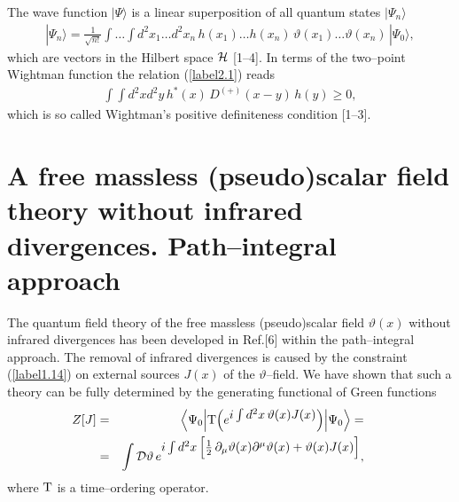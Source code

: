 \documentclass[a4paper,12pt] {article}
\begin{document}
The wave function $|\Psi\rangle$ is a linear superposition of all
quantum states $|\Psi_n\rangle$
%
\begin{eqnarray}\label{label2.2}
|\Psi_n\rangle = \frac{1}{\sqrt{n!}}\int\!\ldots\!\int d^2x_1\ldots
d^2x_n\,h(x_1)\ldots h(x_n)\,\vartheta(x_1)\ldots
\vartheta(x_n)\,|\Psi_0\rangle,
\end{eqnarray}
%
which are vectors in the Hilbert space ${\cal H}$ [1--4]. In terms of
the two--point Wightman function the relation (\ref{label2.1}) reads
%
\begin{eqnarray}\label{label2.3}
\int\!\!\!\int d^2xd^2y\,h^*(x)\,D^{(+)}(x-y)\,h(y) \ge 0,
\end{eqnarray}
%
which is so called Wightman's positive definiteness condition
[1--3].

\section{A free massless (pseudo)scalar 
field theory without infrared divergences. Path--integral approach}
\setcounter{equation}{0}

\hspace{0.2in} The quantum field theory of the free massless
(pseudo)scalar field $\vartheta(x)$ without infrared divergences has
been developed in Ref.[6] within the path--integral approach. The
removal of infrared divergences is caused by the constraint
(\ref{label1.14}) on external sources $J(x)$ of the
$\vartheta$--field. We have shown that such a theory can be fully
determined by the generating functional of Green functions
%
\begin{eqnarray}\label{label3.1}
\hspace{-0.3in}Z[J] &=& \Big\langle \Psi_0\Big|{\rm
T}\Big(e^{\textstyle i\int
d^2x\,\vartheta(x)J(x)}\Big)\Big|\Psi_0\Big\rangle =\nonumber\\ &=&
\int {\cal D}\vartheta\,e^{\textstyle i\int
d^2x\,\Big[\frac{1}{2}\,\partial_{\mu}\vartheta(x)\partial^{\mu}
\vartheta(x) + \vartheta(x)J(x)\Big]},
\end{eqnarray}
%
where ${\rm T}$ is a time--ordering operator.
\end{document}
